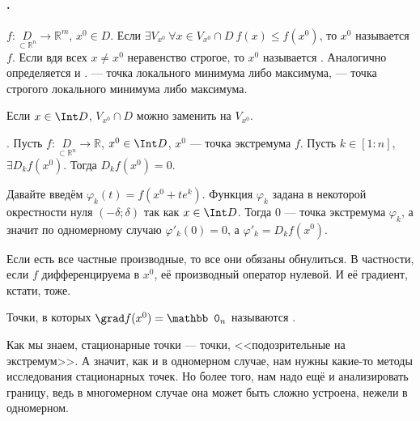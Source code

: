 \documentclass{article}
\begin{document}
    \paragraph{.}
    \begin{itemize}
        \dfn $f\colon\underset{\subset\mathbb R^n}D\to\mathbb R^m$, $x^0\in D$. Если $\exists V_{x^0}~\forall x\in V_{x^0}\cap D~f(x)\leqslant f(x^0)$, то $x^0$ называется  $f$. Если вдя всех $x\neq x^0$ неравенство строгое, то $x^0$ называется .
        \dfn Аналогично определяется  и .
        \dfn {} --- точка локального минимума либо максимума,  --- точка строгого локального минимума либо максимума.
        \begin{Comment}
            Если $x\in\Int D$, $V_{x^0}\cap D$ можно заменить на $V_{x^0}$.
        \end{Comment}
        \thm {}. Пусть $f\colon\underset{\subset\mathbb R^n}D\to\mathbb R$, $x^0\in\Int D$, $x^0$ --- точка экстремума $f$. Пусть $k\in[1:n]$, $\exists D_kf(x^0)$. Тогда $D_kf(x^0)=0$.
        \begin{Proof}
            Давайте введём $\varphi_k(t)=f(x^0+te^k)$. Функция $\varphi_k$ задана в некоторой окрестности нуля $(-\delta;\delta)$ так как $x\in\Int D$. Тогда $0$ --- точка экстремума $\varphi_k$, а значит по одномерному случаю $\varphi'_k(0)=0$, а $\varphi'_k=D_kf(x^0)$.
        \end{Proof}
        \begin{Comment}
            Если есть все частные производные, то все они обязаны обнулиться. В частности, если $f$ дифференцируема в $x^0$, её производный оператор нулевой. И её градиент, кстати, тоже.
        \end{Comment}
        \dfn Точки, в которых $\grad f(x^0)=\mathbb0_n$ называются .
        \begin{Comment}
            Как мы знаем, стационарные точки --- точки, <<подозрительные на экстремум>>. А значит, как и в одномерном случае, нам нужны какие-то методы исследования стационарных точек. Но более того, нам надо ещё и анализировать границу, ведь в многомерном случае она может быть сложно устроена, нежели в одномерном.\\

\end{Comment}
\end{itemize}
\end{document}
